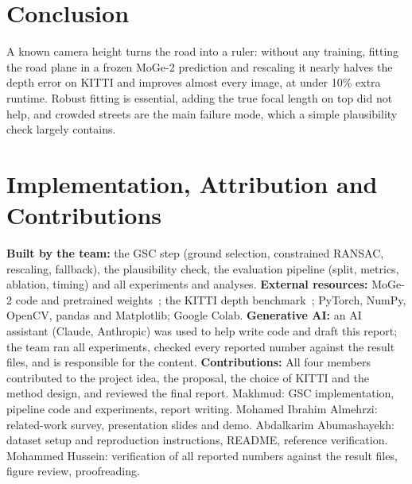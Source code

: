\documentclass[10pt,twocolumn,letterpaper]{article}
\begin{document}
\section{Conclusion}
\label{sec:conclusion}

A known camera height turns the road into a ruler: without any training, fitting the road plane in a
frozen MoGe-2 prediction and rescaling it nearly halves the depth error on KITTI and improves almost
every image, at under 10\% extra runtime. Robust fitting is essential, adding the true focal length on
top did not help, and crowded streets are the main failure mode, which a simple plausibility check
largely contains.

\section*{Implementation, Attribution and Contributions}
\label{sec:attribution}
\textbf{Built by the team:} the GSC step (ground selection, constrained RANSAC, rescaling, fallback),
the plausibility check, the evaluation pipeline (split, metrics, ablation, timing) and all experiments
and analyses. \textbf{External resources:} MoGe-2 code and pretrained weights~\cite{wang2025moge2};
the KITTI depth benchmark~\cite{geiger2012kitti,uhrig2017sparsity}; PyTorch, NumPy, OpenCV, pandas and
Matplotlib; Google Colab. \textbf{Generative AI:} an AI assistant (Claude, Anthropic) was used to help
write code and draft this report; the team ran all experiments, checked every reported number against
the result files, and is responsible for the content. \textbf{Contributions:} All four members contributed to the project idea, the proposal, the
choice of KITTI and the method design, and reviewed the final report.
Makhmud: GSC implementation, pipeline code and experiments, report writing.
Mohamed Ibrahim Almehrzi: related-work survey, presentation slides and demo.
Abdalkarim Abumashayekh: dataset setup and reproduction instructions, README, reference verification.
Mohammed Hussein: verification of all reported numbers against the result files, figure review,
proofreading.

{
    \small
    
    
}
\end{document}
